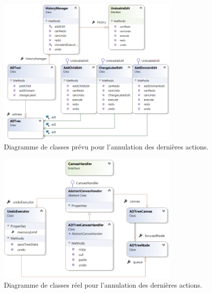        \begin{figure}[H]
            \centering
                \includegraphics[width=0.8\textwidth]{figure/ctrlz.png}
            \caption{Diagramme de classes prévu pour l'annulation des dernières actions.}
            \label{fig:ctrlzPrevu}
        \end{figure}
        
        \begin{figure}[H]
            \centering
                \includegraphics[width=0.8\textwidth]{figure/ctrlzReel.png}
            \caption{Diagramme de classes réel pour l'annulation des dernières actions.}
            \label{fig:ctrlzReel}
        \end{figure}

